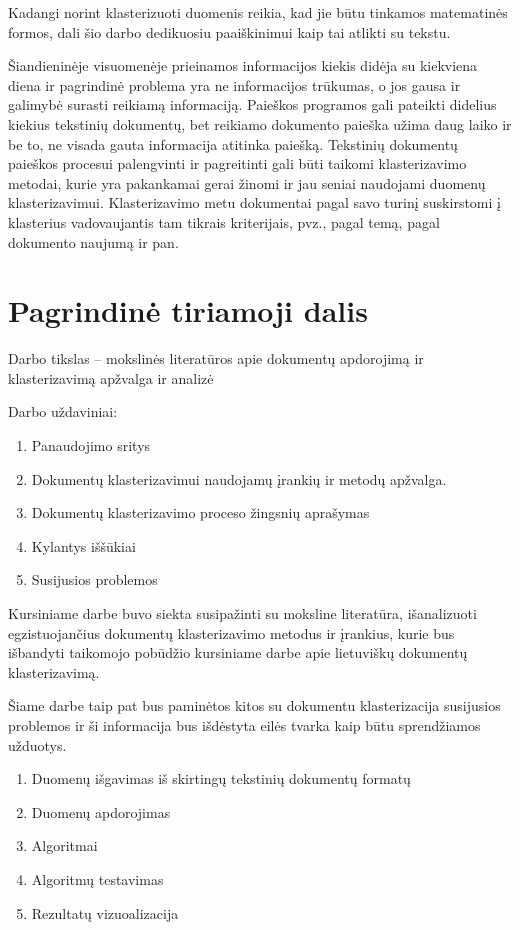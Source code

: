 \documentclass{VUMIFInfKursinis}
\begin{document}
Kadangi norint klasterizuoti duomenis reikia, kad jie būtu tinkamos matematinės formos, dali šio darbo dedikuosiu paaiškinimui kaip tai atlikti su tekstu.

	Šiandieninėje visuomenėje prieinamos informacijos kiekis didėja su kiekviena diena ir pagrindinė problema yra ne informacijos trūkumas, o jos gausa ir galimybė surasti reikiamą informaciją. Paieškos programos gali pateikti didelius kiekius tekstinių dokumentų, bet reikiamo dokumento paieška užima daug laiko ir be to, ne visada gauta informacija atitinka paiešką. Tekstinių dokumentų paieškos procesui palengvinti ir pagreitinti gali būti taikomi klasterizavimo metodai, kurie yra pakankamai gerai žinomi ir jau seniai naudojami duomenų klasterizavimui.  Klasterizavimo metu  dokumentai pagal savo turinį suskirstomi į klasterius vadovaujantis tam tikrais kriterijais, pvz., pagal temą, pagal dokumento naujumą ir pan. 

\section{Pagrindinė tiriamoji dalis}
	Darbo tikslas – mokslinės literatūros apie dokumentų apdorojimą ir klasterizavimą apžvalga ir analizė  

	Darbo uždaviniai: 
	\begin{enumerate}
		\item Panaudojimo sritys
		\item Dokumentų klasterizavimui naudojamų įrankių ir metodų apžvalga.
		\item Dokumentų klasterizavimo proceso žingsnių aprašymas
		\item Kylantys iššūkiai  
		\item Susijusios problemos 
	\end{enumerate}

	Kursiniame darbe buvo siekta susipažinti su moksline literatūra, išanalizuoti egzistuojančius dokumentų klasterizavimo metodus ir įrankius, kurie bus išbandyti taikomojo pobūdžio  kursiniame darbe apie lietuviškų dokumentų klasterizavimą.

	Šiame darbe taip pat bus paminėtos kitos su dokumentu klasterizacija susijusios problemos ir ši informacija bus išdėstyta eilės tvarka kaip būtu sprendžiamos užduotys.
	\begin{enumerate}
		\item Duomenų išgavimas iš skirtingų tekstinių dokumentų formatų
		\item Duomenų apdorojimas
		\item Algoritmai
		\item Algoritmų testavimas
		\item Rezultatų vizuoalizacija
	\end{enumerate}
\end{document}
